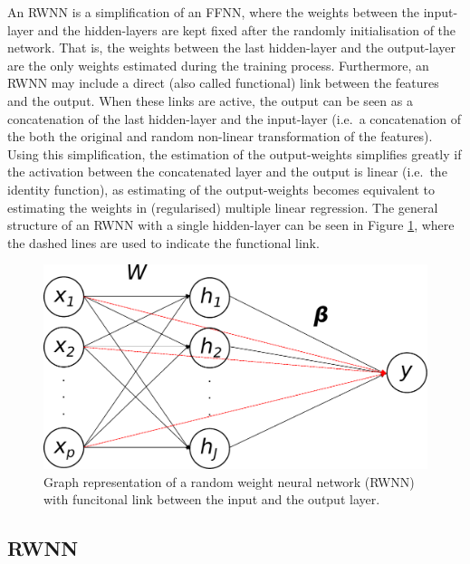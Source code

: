 \documentclass[
]{jss}
\begin{document}
An RWNN is a simplification of an FFNN, where the weights between the
input-layer and the hidden-layers are kept fixed after the randomly
initialisation of the network. That is, the weights between the last
hidden-layer and the output-layer are the only weights estimated during
the training process. Furthermore, an RWNN may include a direct (also
called functional) link between the features and the output. When these
links are active, the output can be seen as a concatenation of the last
hidden-layer and the input-layer (i.e.~a concatenation of the both the
original and random non-linear transformation of the features). Using
this simplification, the estimation of the output-weights simplifies
greatly if the activation between the concatenated layer and the output
is linear (i.e.~the identity function), as estimating of the
output-weights becomes equivalent to estimating the weights in
(regularised) multiple linear regression. The general structure of an
RWNN with a single hidden-layer can be seen in Figure \ref{fig:rwnn},
where the dashed lines are used to indicate the functional link.

\begin{CodeChunk}
\begin{figure}[ht!]

{\centering \includegraphics[width=0.6\linewidth]{./Figures/RWNN} 

}

\caption[Graph representation of a random weight neural network (RWNN) with funcitonal link between the input and the output layer]{Graph representation of a random weight neural network (RWNN) with funcitonal link between the input and the output layer.}\label{fig:rwnn}
\end{figure}
\end{CodeChunk}

\hypertarget{rwnn}{%
\subsection{RWNN}\label{rwnn}}
\end{document}
